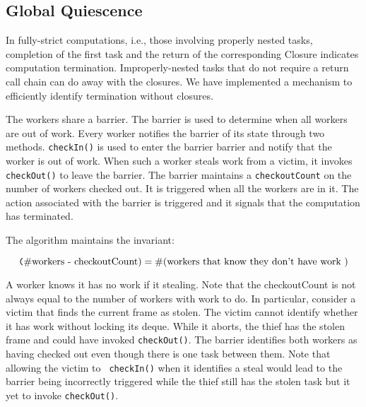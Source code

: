 \documentclass[10pt]{article}
\numberwithin{equation}{section}
\newcommand{\java}{\tt}
\begin{document}
%
%
%
\subsection{Global Quiescence}

In fully-strict computations, i.e., those involving properly nested
tasks, completion of the first task and the return of the
corresponding Closure indicates computation termination.
Improperly-nested tasks that do not require a return call chain can do
away with the closures. We have implemented a mechanism to efficiently
identify termination without closures.

The workers share a barrier. The barrier is used to determine when all
workers are out of work. Every worker notifies the barrier of its
state through two methods. {\java checkIn()} is used to enter the
barrier barrier and notify that the worker is out of work. When such a
worker steals work from a victim, it invokes {\java checkOut()} to
leave the barrier. The barrier maintains a {\java checkoutCount} on
the number of workers checked out. It is triggered when all the workers
are in it. The action associated with the barrier is triggered and it
signals that the computation has terminated.

The algorithm maintains the invariant:

\[
\mbox{{\texttt (\#workers - checkoutCount)}} = \mbox{\#(workers that know they don't
  have work )}
\]

A worker knows it has no work if it stealing. Note that the
checkoutCount is not always equal to the number of workers with work
to do. In particular, consider a victim that finds the current frame
as stolen. The victim cannot identify whether it has work without
locking its deque. While it aborts, the thief has the stolen
frame and could have invoked {\java checkOut()}. The barrier
identifies both workers as having checked out even though there is one
task between them. Note that allowing the victim to {\java
  checkIn()} when it identifies a steal would lead to the barrier
being incorrectly triggered while the thief still has the stolen task
but it yet to invoke {\java checkOut()}.
\end{document}
